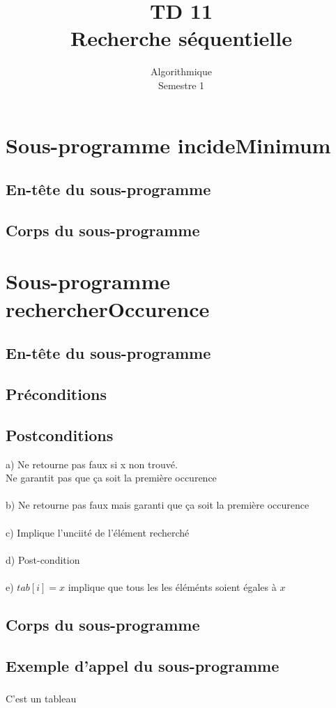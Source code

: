 \documentclass{article}
\title{TD 11\\ Recherche séquentielle }
\date{Algorithmique\\ Semestre 1}
\begin{document}
	\maketitle
	\section{Sous-programme incideMinimum}
		\subsection{En-tête du sous-programme}
			
		\subsection{Corps du sous-programme}
			
	\section{Sous-programme rechercherOccurence}		
		\subsection{En-tête du sous-programme}
			
		\subsection{Préconditions}
			
		\subsection{Postconditions}
			a) Ne retourne pas faux si x non trouvé. \\ Ne garantit pas que ça soit la première occurence\\ \\
			b) Ne retourne pas faux mais garanti que ça soit la première occurence \\ \\
			c) Implique l'unciité de l'élément recherché \\ \\
			d) Post-condition\\ \\
			e) $tab[i] = x$ implique que tous les les éléménts soient égales à $x$
		\subsection{Corps du sous-programme}
			
			

		\subsection{Exemple d'appel du sous-programme}
			\subsubsection{}	
				C'est un tableau
			\subsubsection{}	
				
\end{document}
